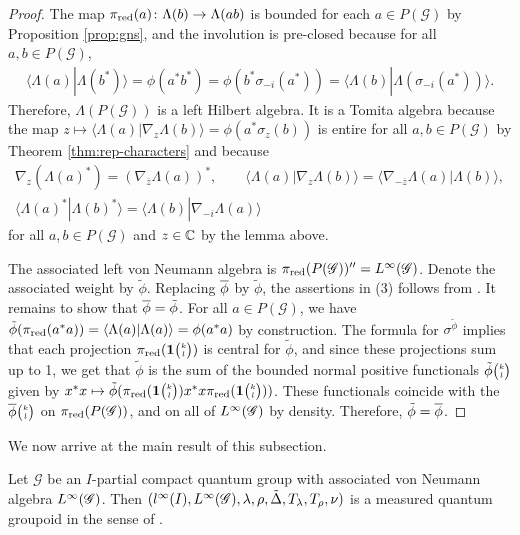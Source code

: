 \begin{proof}
 The map $\pi_{\operatorname{\mathrm{red}}}(a)\colon \Lambda(b) \to \Lambda(ab)$ is bounded for  each $a \in P(\mathscr{G})$ by Proposition \ref{prop:gns}, and the   involution is pre-closed because for all $a,b \in P(\mathscr{G})$,
  \begin{align*}
    \langle \Lambda(a)|\Lambda(b^{*})\rangle = \phi(a^{*}b^{*}) =
    \phi(b^{*}\sigma_{-i}(a^{*})) = \langle
    \Lambda(b)|\Lambda(\sigma_{-i}(a^{*}))\rangle.
  \end{align*}
  Therefore, $\Lambda(P(\mathscr{G}))$ is a left Hilbert algebra. It  is a Tomita algebra because the  map $z\mapsto \langle \Lambda(a)|\nabla_{z}\Lambda(b)\rangle =
  \phi(a^{*}\sigma_{z}(b))$ is entire for all $a,b\in P(\mathscr{G})$  by Theorem \ref{thm:rep-characters}
  and because
  \begin{gather*}
    \nabla_{z}(\Lambda(a)^{*}) = (\nabla_{\overline{z}}\Lambda(a))^{*}, \qquad
    \langle \Lambda(a)|\nabla_{z}\Lambda(b)\rangle = \langle
    \nabla_{-\overline{z}}\Lambda(a) |\Lambda(b)\rangle, \\ \langle
    \Lambda(a)^{*}|\Lambda(b)^{*}\rangle = \langle \Lambda(b)|\nabla_{-i}\Lambda(a)\rangle
  \end{gather*}
  for all $a,b\in P(\mathscr{G})$ and $z\in \mathbb{C}$ by the lemma above.

 The associated left von Neumann algebra  is $\pi_{\operatorname{\mathrm{red}}}(P(\mathscr{G}))''=L^{\infty}(\mathscr{G})$. Denote the associated weight by $\tilde \phi$. Replacing $\overline{\phi}$ by $\tilde \phi$, the assertions in (3)  follows  from  \cite[Theorem VI.2.2 and its proof]{Taksak2}. It remains to show that $\overline{\phi} = \tilde \phi$. For all $a\in P(\mathscr{G})$, we have $\tilde \phi(\pi_{\operatorname{\mathrm{red}}}(a^{*}a))=\langle \Lambda(a)|\Lambda(a)\rangle = \phi(a^{*}a)$ by construction. The formula for $\sigma^{\tilde\phi}$ implies that each projection $\pi_{\operatorname{\mathrm{red}}}(\mathbf{1}{\tiny {\begin{pmatrix} k\\l\end{pmatrix}}})$ is central for $\tilde \phi$, and since these projections sum up to 1, we get that $\tilde \phi$ is the sum of the bounded normal positive functionals $\tilde \phi{\tiny {\begin{pmatrix} k\\l\end{pmatrix}}}$ given by $x^{*}x \mapsto \tilde \phi(\pi_{\operatorname{\mathrm{red}}}(\mathbf{1}{\tiny {\begin{pmatrix} k\\l\end{pmatrix}}})x^{*}x\pi_{\operatorname{\mathrm{red}}}(\mathbf{1}{\tiny {\begin{pmatrix} k\\l\end{pmatrix}}}))$. These functionals coincide with the $\overline{\phi}{\tiny {\begin{pmatrix} k\\l\end{pmatrix}}}$ on  $\pi_{\operatorname{\mathrm{red}}}(P(\mathscr{G}))$,  and on all of $L^{\infty}(\mathscr{G})$ by density. Therefore, $\tilde \phi = \overline{\phi}$.
\end{proof}
We now arrive at the main result of this subsection.
\begin{Theorem}
  Let $\mathscr{G}$ be an $I$-partial compact quantum group with  associated von Neumann algebra $L^{\infty}(\mathscr{G})$. Then
  $(l^{\infty}(I),L^{\infty}(\mathscr{G}), \lambda,\rho,\tilde\Delta,
  T_{\lambda},T_{\rho},\nu)$ is a measured quantum groupoid in the  sense of \cite{Eno2}.
\end{Theorem}

